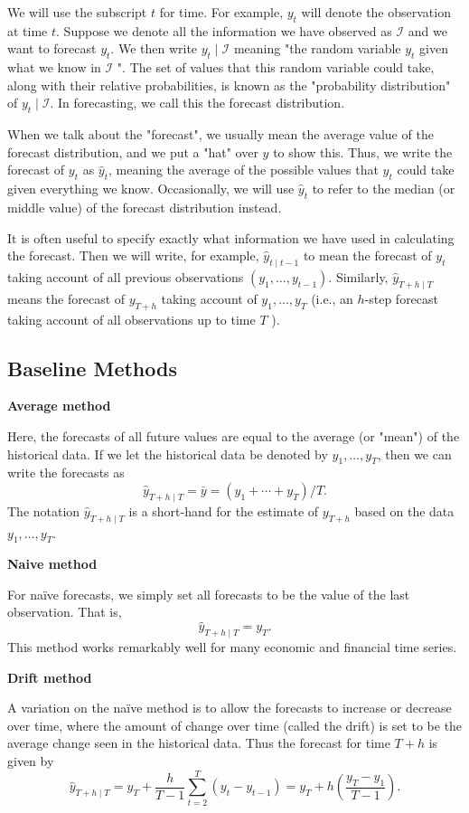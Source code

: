 \documentclass[openany]{book}
\begin{document}
We will use the subscript $t$ for time. For example, $y_t$ will denote the observation at time $t$. Suppose we denote all the information we have observed as $\mathcal{I}$ and we want to forecast $y_t$. We then write $y_t \mid \mathcal{I}$ meaning "the random variable $y_t$ given what we know in $\mathcal{I}$ ". The set of values that this random variable could take, along with their relative probabilities, is known as the "probability distribution" of $y_t \mid \mathcal{I}$. In forecasting, we call this the forecast distribution.

When we talk about the "forecast", we usually mean the average value of the forecast distribution, and we put a "hat" over $y$ to show this. Thus, we write the forecast of $y_t$ as $\hat{y}_t$, meaning the average of the possible values that $y_t$ could take given everything we know.
Occasionally, we will use $\hat{y}_t$ to refer to the median (or middle value) of the forecast distribution instead.

It is often useful to specify exactly what information we have used in calculating the forecast. Then we will write, for example, $\hat{y}_{t \mid t-1}$ to mean the forecast of $y_t$ taking account of all previous observations $\left(y_1, \ldots, y_{t-1}\right)$. Similarly, $\hat{y}_{T+h \mid T}$ means the forecast of $y_{T+h}$ taking account of $y_1, \ldots, y_T$ (i.e., an $h$-step forecast taking account of all observations up to time $T$ ).
\subsection{Baseline Methods}


\textbf{Average method}

Here, the forecasts of all future values are equal to the average (or "mean") of the historical data. If we let the historical data be denoted by $y_1, \ldots, y_T$, then we can write the forecasts as
$$
\hat{y}_{T+h \mid T}=\bar{y}=\left(y_1+\cdots+y_T\right) / T .
$$
The notation $\hat{y}_{T+h \mid T}$ is a short-hand for the estimate of $y_{T+h}$ based on the data $y_1, \ldots, y_T$.

\textbf{Naive method}

For naïve forecasts, we simply set all forecasts to be the value of the last observation. That is,
$$
\hat{y}_{T+h \mid T}=y_T .
$$
This method works remarkably well for many economic and financial time series.


\textbf{Drift method}

A variation on the naïve method is to allow the forecasts to increase or decrease over time, where the amount of change over time (called the drift) is set to be the average change seen in the historical data. Thus the forecast for time $T+h$ is given by
$$
\hat{y}_{T+h \mid T}=y_T+\frac{h}{T-1} \sum_{t=2}^T\left(y_t-y_{t-1}\right)=y_T+h\left(\frac{y_T-y_1}{T-1}\right) .
$$
\end{document}
